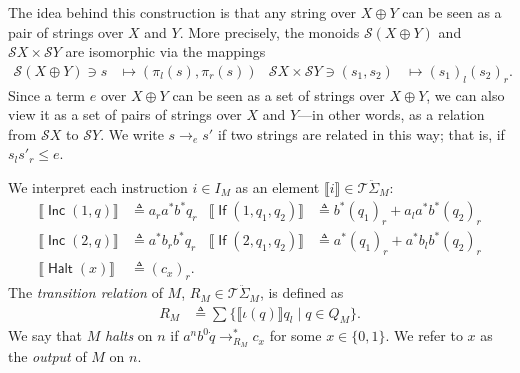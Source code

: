 \documentclass[a4paper,UKenglish,cleveref, autoref, thm-restate]{lipics-v2021}
\DeclareMathOperator{\Inc}{\mathsf{Inc}}
\DeclareMathOperator{\If}{\mathsf{If}}
\DeclareMathOperator{\Halt}{\mathsf{Halt}}
\begin{document}
The idea behind this construction is that any string over $X \oplus Y$ can be
seen as a pair of strings over $X$ and $Y$.  More precisely, the monoids
$\mathcal{S}(X \oplus Y)$ and $\mathcal{S}X \times \mathcal{S}Y$ are isomorphic
via the mappings
\begin{align*}
  \mathcal{S}(X  \oplus  Y)  \ni  s &  \mapsto  ( \pi _l(s),  \pi _r(s))  &
  \mathcal{S}X  \times  \mathcal{S}Y  \ni  (s_1,s_2) &  \mapsto  (s_1)_l(s_2)_r.
\end{align*}
Since a term $e$ over $X \oplus Y$ can be seen as a set of strings over
$X \oplus Y$, we can also view it as a set of pairs of strings over $X$ and
$Y$---in other words, as a relation from $\mathcal{S}X$ to $\mathcal{S}Y$.  We
write $s \to _e s'$ if two strings are related in this way; that is, if
$s_ls'_r \leq e$.

\begin{definition}
  \label{def:two-counter-transition}
  We interpret each instruction $i  \in  I_M$ as an element $ \llbracket i \rrbracket   \in  \mathcal{T}\ddot{ \Sigma }_M$:
  \begin{align*}
     \llbracket \Inc(1,q) \rrbracket  &  \triangleq  a_ra^*b^*q_r &
     \llbracket \If(1,q_{1},q_{2}) \rrbracket  &  \triangleq  b^*(q_{1})_r + a_la^*b^*(q_{2})_r \\
     \llbracket \Inc(2,q) \rrbracket  &  \triangleq  a^*b_rb^*q_r &
     \llbracket \If(2,q_{1},q_{2}) \rrbracket  &  \triangleq  a^*(q_{1})_r + a^*b_lb^*(q_{2})_r \\
     \llbracket \Halt(x) \rrbracket  &  \triangleq  (c_x)_r.
  \end{align*}
  The \emph{transition relation} of $M$, $R_M  \in  \mathcal{T}\ddot{ \Sigma }_M$, is defined as
  \begin{align*}
     R_M &  \triangleq   \sum \{ \llbracket  \iota (q) \rrbracket q_l \mid q  \in  Q_M \}.
  \end{align*}
  We say that $M$ \emph{halts} on $n$ if $a^nb^0\dot{q}  \to _{R_M}^* c_x$ for some
  $x  \in  \{0,1\}$.  We refer to $x$ as the \emph{output} of $M$ on $n$.
\end{definition}
\end{document}
